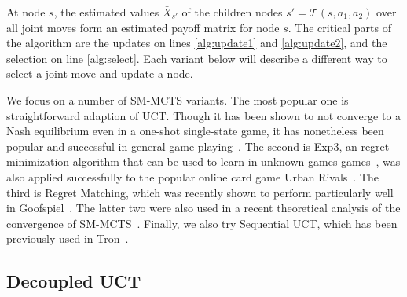 \documentclass[conference]{IEEEtran}
\newcommand{\cA}{\mathcal{A}}
\newcommand{\cT}{\mathcal{T}}
\begin{document}
At node $s$, the estimated values $\bar{X}_{s'}$ of the children nodes $s' = \cT(s,a_1,a_2)$ over all 
joint moves form an estimated payoff matrix for node $s$. 
The critical parts of the algorithm are the updates on lines \ref{alg:update1} and \ref{alg:update2}, and the selection 
on line \ref{alg:select}. 
Each variant below will describe a different way to select a joint move and update a node. 


We focus on a number of SM-MCTS variants. The most popular one is straightforward adaption of UCT. 
Though it has been shown to not converge to a Nash equilibrium even in a one-shot single-state 
game, it has nonetheless been popular and successful in general game playing~\cite{Shafiei09}. 
The second is Exp3, an regret minimization algorithm that can be used to learn in unknown games
games~\cite{Exp3}, was also applied successfully to the popular online card game Urban Rivals~\cite{Teytaud11Upper,StPierre12Online}. 
The third is Regret Matching, which was recently shown to perform particularly well in Goofspiel~\cite{Lanctot13Goofspiel}.
The latter two were also used in a recent theoretical analysis of the convergence of SM-MCTS~\cite{Lisy13Computing}.
Finally, we also try Sequential UCT, which has been previously used in Tron~\cite{Samothrakis10Tron,Lanctot13Tron}.

\subsection{Decoupled UCT} 
\end{document}
